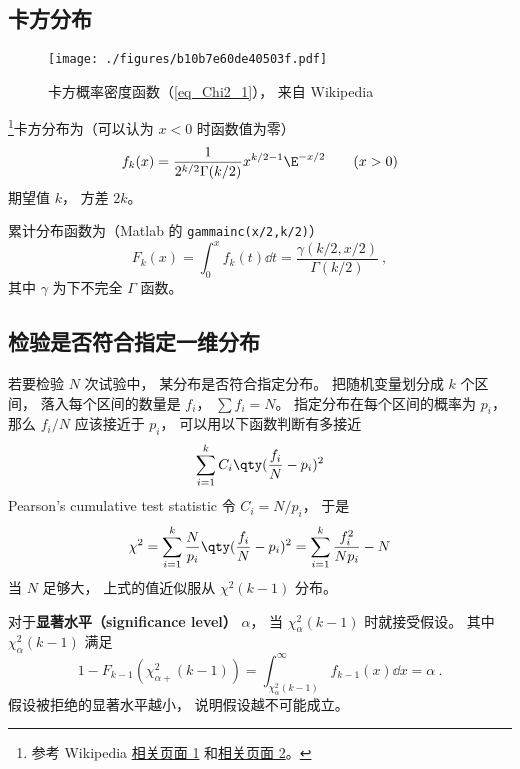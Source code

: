 
\begin{issues}
\issueDraft
\end{issues}

\subsection{卡方分布}
\begin{figure}[ht]
\centering
\texttt{[image: ./figures/b10b7e60de40503f.pdf]}
\caption{卡方概率密度函数（\autoref{eq_Chi2_1}）， 来自 Wikipedia} \label{fig_Chi2_1}
\end{figure}

\footnote{参考 Wikipedia \href{https://en.wikipedia.org/wiki/Chi-squared_distribution}{相关页面 1} 和\href{https://en.wikipedia.org/wiki/Pearson's_chi-squared_test}{相关页面 2}。}卡方分布为（可以认为 $x<0$ 时函数值为零）
\begin{equation}\label{eq_Chi2_1}
f_k(x) = \frac{1}{2^{k/2}\Gamma(k/2)}x^{k/2-1}\E^{-x/2} \qquad (x > 0)
\end{equation}
期望值 $k$， 方差 $2k$。

累计分布函数为（Matlab 的 \verb|gammainc(x/2,k/2)|）
\begin{equation}
F_k(x) = \int_0^{x} f_k(t) \dd{t} = \frac{\gamma(k/2, x/2)}{\Gamma(k/2)}~,
\end{equation}
其中 $\gamma$ 为下不完全 $\Gamma$ 函数。

\subsection{检验是否符合指定一维分布}
若要检验 $N$ 次试验中， 某分布是否符合指定分布。 把随机变量划分成 $k$ 个区间， 落入每个区间的数量是 $f_i$， $\sum f_i = N$。 指定分布在每个区间的概率为 $p_i$， 那么 $f_i/N$ 应该接近于 $p_i$， 可以用以下函数判断有多接近
\begin{equation}
\sum_{i=1}^k C_i \qty(\frac{f_i}{N} - p_i)^2
\end{equation}
Pearson's cumulative test statistic 令 $C_i = N/p_i$， 于是
\begin{equation}
\chi^2 = \sum_{i=1}^k \frac{N}{p_i} \qty(\frac{f_i}{N} - p_i)^2 = \sum_{i=1}^k \frac{f_i^2}{Np_i} - N
\end{equation}
当 $N$ 足够大， 上式的值近似服从 $\chi^2(k-1)$ 分布。

对于\textbf{显著水平（significance level）} $\alpha$， 当 $\chi_{\alpha}^2(k-1)$ 时就接受假设。 其中 $\chi_{\alpha}^2(k-1)$ 满足
\begin{equation}
1 - F_{k-1}(\chi_{\alpha+}^2(k-1)) = \int_{\chi_{\alpha}^2(k-1)}^\infty f_{k-1}(x) \dd{x} = \alpha~.
\end{equation}
假设被拒绝的显著水平越小， 说明假设越不可能成立。

